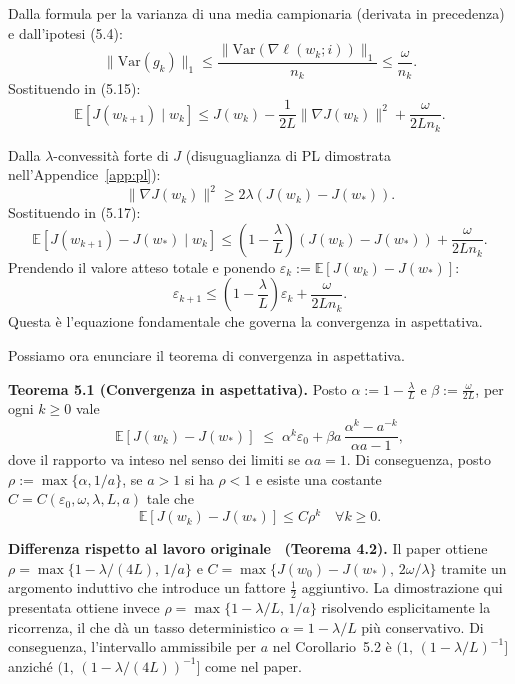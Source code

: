 \documentclass[a4paper,12pt]{article}
\numberwithin{equation}{section}
\numberwithin{figure}{section}
\numberwithin{table}{section}
\begin{document}
Dalla formula per la varianza di una media campionaria (derivata in precedenza) e dall'ipotesi (5.4):
\[
\|\mathrm{Var}(g_k)\|_1 \le \frac{\|\mathrm{Var}(\nabla \ell(w_k;i))\|_1}{n_k} \le \frac{\omega}{n_k}. \tag{5.16}
\]
Sostituendo in (5.15):
\[
\mathbb{E}[J(w_{k+1}) \mid w_k] \le J(w_k) - \frac{1}{2L}\|\nabla J(w_k)\|^2 + \frac{\omega}{2L n_k}. \tag{5.17}
\]

Dalla \(\lambda\)-convessità forte di \(J\) (disuguaglianza di PL dimostrata nell'Appendice~\ref{app:pl}):
\[
\|\nabla J(w_k)\|^2 \ge 2\lambda (J(w_k) - J(w_*)). \tag{5.18}
\]
Sostituendo in (5.17):
\[
\mathbb{E}[J(w_{k+1}) - J(w_*) \mid w_k] \le \left(1 - \frac{\lambda}{L}\right)(J(w_k) - J(w_*)) + \frac{\omega}{2L n_k}. \tag{5.19}
\]
Prendendo il valore atteso totale e ponendo \(\varepsilon_k := \mathbb{E}[J(w_k) - J(w_*)]\):
\[
\varepsilon_{k+1} \le \left(1 - \frac{\lambda}{L}\right)\varepsilon_k + \frac{\omega}{2L n_k}. \tag{5.20}
\]
Questa è l'equazione fondamentale che governa la convergenza in aspettativa.

Possiamo ora enunciare il teorema di convergenza in aspettativa.

\begin{thmbox}
\textbf{Teorema 5.1 (Convergenza in aspettativa).}
Posto $\alpha := 1-\frac{\lambda}{L}$ e $\beta := \frac{\omega}{2L}$, per ogni $k\ge 0$ vale
\[
\mathbb{E}[J(w_k)-J(w_*)] \;\le\; \alpha^k\varepsilon_0
+ \beta a\,\frac{\alpha^k-a^{-k}}{\alpha a-1},
\tag{5.21}
\]
dove il rapporto va inteso nel senso dei limiti se $\alpha a=1$.
Di conseguenza, posto $\rho:=\max\{\alpha,1/a\}$, se $a>1$ si ha $\rho<1$ e
esiste una costante $C=C(\varepsilon_0,\omega,\lambda,L,a)$ tale che
\[
\mathbb{E}[J(w_k)-J(w_*)]\le C\rho^k\quad\forall k\ge0.
\]
\end{thmbox}

\begin{notebox}
  \textbf{Differenza rispetto al lavoro originale~\cite{byrd2012} (Teorema 4.2).}
  Il paper ottiene \(\rho = \max\{1-\lambda/(4L),\,1/a\}\) e \(C = \max\{J(w_0)-J(w_*),\,2\omega/\lambda\}\) tramite un argomento induttivo che introduce un fattore \(\tfrac{1}{2}\) aggiuntivo. La dimostrazione qui presentata ottiene invece \(\rho = \max\{1-\lambda/L,\,1/a\}\) risolvendo esplicitamente la ricorrenza, il che dà un tasso deterministico \(\alpha = 1-\lambda/L\) più conservativo. Di conseguenza, l'intervallo ammissibile per \(a\) nel Corollario~5.2 è \((1,\,(1-\lambda/L)^{-1}]\) anziché \((1,\,(1-\lambda/(4L))^{-1}]\) come nel paper.
\end{notebox}
\end{document}
